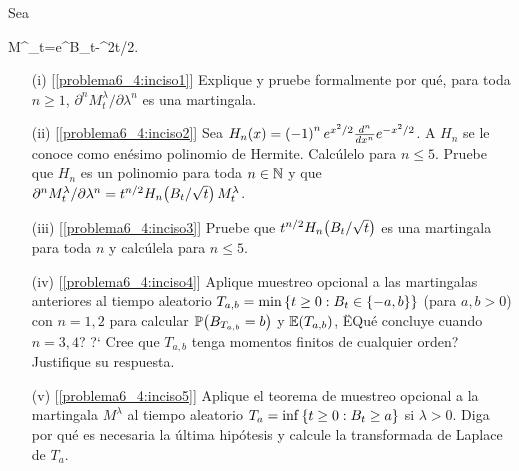 \begin{problema}
	Sea
	\begin{esn}
		M^\lambda_t=e^{\lambda B_t-\lambda^2t/2}.
	\end{esn}
		\begin{enumerate}
			\item[(i)]      [\ref{problema6_4:inciso1}]
                Explique y pruebe formalmente por qu\'e, para toda 
                $n\geq 1$, $\partial^n M^\lambda_t/\partial \lambda^n$ es una martingala.\pn
                
			\item[(ii)]     [\ref{problema6_4:inciso2}]
                Sea $H_n\!\left( x\right) =\left( -1\right) ^ne^{x^2/2}\frac{d^n}{dx^n}e^{-x^2/2}$.
                A $H_n$ se le conoce como en\'esimo polinomio de Hermite. Calc\'ulelo para 
                $n\leq 5$. Pruebe que $H_n$ es un polinomio para toda $n\in\mathbb{N}$ y que 
                $\partial^n M^\lambda_t/\partial \lambda^n=t^{n/2}H_n\!\left( B_t/\sqrt{t}\right) M^\lambda_t$.\pn
                
			\item[(iii)]    [\ref{problema6_4:inciso3}]
                Pruebe que $t^{n/2}H_n\!\left( B_t/\sqrt{t}\right) $ es una martingala para 
                toda $n$ y calc\'ulela para $n\leq 5$.\pn
                
			\item[(iv)]     [\ref{problema6_4:inciso4}]
                Aplique muestreo opcional a las martingalas anteriores al tiempo 
                aleatorio $T_{a,b}=\min\left\{ t\geq 0:B_t\in\left\{ -a,b\right\} \right\} $ (para $a,b>0$) 
                con $n=1,2$ para calcular $\mathbb{P}\! \left( B_{T_{a,b}}=b \right)$ y $\mathbb{E}\! \left( T_{a,b} \right)$,
                ËQu\'e concluye cuando $n=3,4$? ?` Cree que $T_{a,b}$ tenga momentos 
                finitos de cualquier orden? Justifique su respuesta.\pn
			
            \item[(v)]      [\ref{problema6_4:inciso5}]
                Aplique el teorema de muestreo opcional a la martingala 
                $M^\lambda $ al tiempo aleatorio $T_a=\inf\left\{ t\geq 0:B_t\geq a\right\} $ 
                si $\lambda>0$. Diga por qu\'e es necesaria la \'ultima 
                hip\'otesis y calcule la transformada de Laplace de $T_a$. 
		\end{enumerate}
\end{problema}

